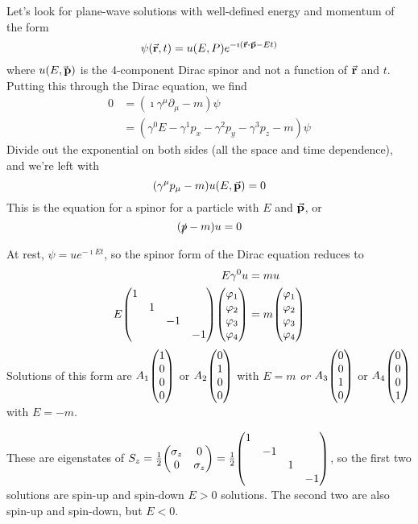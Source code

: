 \documentclass[a4paper,twoside,master.tex]{subfiles}
\begin{document}
Let's look for plane-wave solutions with well-defined energy and momentum of the form
\begin{equation}
    \psi(\va{r}, t) = u(E,P) e^{- \imath (\va{r} \vdot \va{p} - E t)} 
\end{equation}
where $ u(E\va{,p}) $ is the 4-component Dirac spinor and not a function of $ \va{r} $ and $ t $. Putting this through the Dirac equation, we find
\begin{align}
    0 &= (\imath \gamma^{\mu} \partial_{\mu} - m) \psi \\
    &= (\gamma^0 E - \gamma^1 p_x - \gamma^2 p_y - \gamma^3 p_z - m) \psi
\end{align}
Divide out the exponential on both sides (all the space and time dependence), and we're left with
\begin{equation}
    (\gamma^{\mu} p_{\mu} - m) u(E, \va{p}) = 0
\end{equation}
This is the equation for a spinor for a particle with $ E $ and $ \va{p} $, or
\begin{equation}
    (\slashed{p} - m) u = 0
\end{equation}

At rest, $ \psi = u e^{- \imath E t} $, so the spinor form of the Dirac equation reduces to
\begin{align}
    E \gamma^0 u &= m u \\
    E \mqty(\dmat{1,1,-1,-1}) \mqty(\varphi_1\\ \varphi_2\\ \varphi_3\\ \varphi_4) &= m\mqty(\varphi_1\\ \varphi_2\\ \varphi_3\\ \varphi_4)
\end{align}
Solutions of this form are $ A_1 \mqty(1\\0\\0\\0) $ or $ A_2 \mqty(0\\1\\0\\0) $ with $ E = m $ \textit{or} $ A_3 \mqty(0\\0\\1\\0) $ or $ A_4 \mqty(0\\0\\0\\1) $ with $ E = -m $.

These are eigenstates of $ S_z = \frac{1}{2} \mqty(\sigma_z & 0 \\ 0 & \sigma_z) = \frac{1}{2} \mqty(\dmat{1,-1,1,-1}) $, so the first two solutions are spin-up and spin-down $ E>0 $ solutions. The second two are also spin-up and spin-down, but $ E<0 $.
\end{document}
